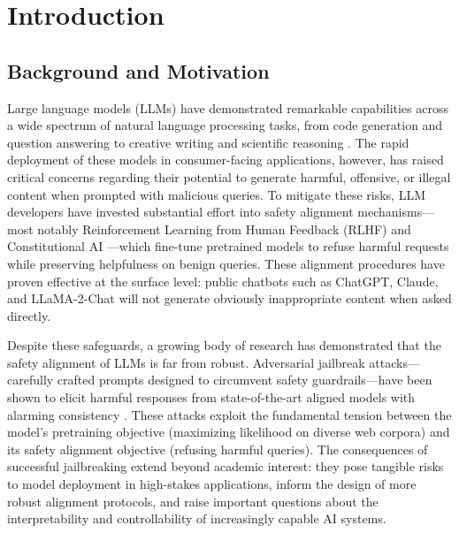 \documentclass[preprint,12pt]{elsarticle}
\begin{document}
\section{Introduction}
\label{sec:introduction}

\subsection{Background and Motivation}
\label{sec:background}

Large language models (LLMs) have demonstrated remarkable capabilities across a wide spectrum of natural language processing tasks, from code generation and question answering to creative writing and scientific reasoning \cite{ouyang2022training, bai2022constitutional}. The rapid deployment of these models in consumer-facing applications, however, has raised critical concerns regarding their potential to generate harmful, offensive, or illegal content when prompted with malicious queries. To mitigate these risks, LLM developers have invested substantial effort into safety alignment mechanisms---most notably Reinforcement Learning from Human Feedback (RLHF) \cite{ouyang2022training} and Constitutional AI \cite{bai2022constitutional}---which fine-tune pretrained models to refuse harmful requests while preserving helpfulness on benign queries. These alignment procedures have proven effective at the surface level: public chatbots such as ChatGPT, Claude, and LLaMA-2-Chat will not generate obviously inappropriate content when asked directly.

Despite these safeguards, a growing body of research has demonstrated that the safety alignment of LLMs is far from robust. Adversarial jailbreak attacks---carefully crafted prompts designed to circumvent safety guardrails---have been shown to elicit harmful responses from state-of-the-art aligned models with alarming consistency \cite{zou2023universal, chao2023jailbreaking, mehrotra2023tree}. These attacks exploit the fundamental tension between the model's pretraining objective (maximizing likelihood on diverse web corpora) and its safety alignment objective (refusing harmful queries). The consequences of successful jailbreaking extend beyond academic interest: they pose tangible risks to model deployment in high-stakes applications, inform the design of more robust alignment protocols, and raise important questions about the interpretability and controllability of increasingly capable AI systems.
\end{document}
